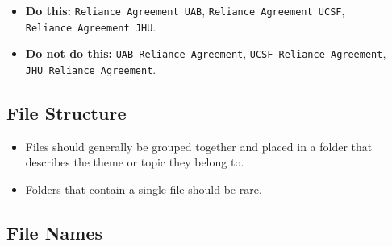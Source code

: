 \documentclass[
  letterpaper,
  DIV=11,
  numbers=noendperiod]{scrreprt}
\providecommand{\tightlist}{%
  \setlength{\itemsep}{0pt}\setlength{\parskip}{0pt}}\usepackage{longtable,booktabs,array}
\begin{document}
\begin{itemize}
  \begin{itemize}
  \tightlist
  \item
    \textbf{Do this:} \texttt{Reliance\ Agreement\ UAB},
    \texttt{Reliance\ Agreement\ UCSF},
    \texttt{Reliance\ Agreement\ JHU}.
  \item
    \textbf{Do not do this:} \texttt{UAB\ Reliance\ Agreement},
    \texttt{UCSF\ Reliance\ Agreement},
    \texttt{JHU\ Reliance\ Agreement}.
  \end{itemize}
\end{itemize}

\subsection{File Structure}\label{file-structure}

\begin{itemize}
\tightlist
\item
  Files should generally be grouped together and placed in a folder that
  describes the theme or topic they belong to.
\item
  Folders that contain a single file should be rare.
\end{itemize}

\subsection{File Names}\label{file-names}
\end{document}
